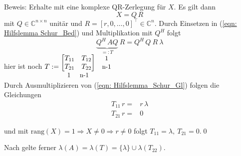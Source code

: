 \documentclass[a4paper,12pt]{report}
\newcommand{\C}{\mathbb C}
\newcommand{\rang}{\text{rang}}
\newcommand{\1}{\mathds{1}}
\theoremstyle{plain} %
\theoremstyle{definition} %
\theoremstyle{remark}
\begin{document}
            Beweis:
            Erhalte mit \cite[S. 233]{matrixGolub} eine komplexe QR-Zerlegung für $X$. Es gilt dann
            $$X = Q\,R$$
            mit $Q\in \C^{n \times n}$ unitär und $R = [r,0,\dots,0]^\top\in \C^n$.
            Durch Einsetzen in (\ref{eqn: Hilfslemma Schur_Bed}) und Multiplikation mit $Q^H$ folgt
            \begin{equation}
                  \label{eqn: Hilfslemma_Schur_Gl}
                  \underbrace{Q^H\,AQ}_{=:T}\ R = Q^H\,Q\ R\ \lambda
            \end{equation}
            hier ist noch $T:=\begin{matrix}
                  \begin{bmatrix}
                        T_{11} & T_{12}\\
                        T_{21} & T_{22}\\
                  \end{bmatrix} & \begin{matrix}
                  \text{\small 1} \\\text{\small{n-1}}
                  \end{matrix} \\
                  \begin{matrix}
                  \text{\small 1} &  \text{  \small{n-1}}\\
                  \end{matrix} &  \\
                  \end{matrix}$\\

            Durch Ausmultiplizieren von (\ref{eqn: Hilfslemma_Schur_Gl}) folgen die Gleichungen\\

            $$\begin{aligned}
                  T_{11}\,r =& r\,\lambda\\
                  T_{21}\,r =& 0
            \end{aligned}$$

            und mit $\rang(X)=1 \Rightarrow X\ne 0 \Rightarrow r\ne 0$ folgt $T_{11} = \lambda,\ T_{21} = 0$.\qed

            Nach \cite[S. 312]{matrixGolub} gelte ferner $\lambda(A) = \lambda(T) = \{\lambda\}\cup\lambda(T_{22})$.\\
            
\end{document}
